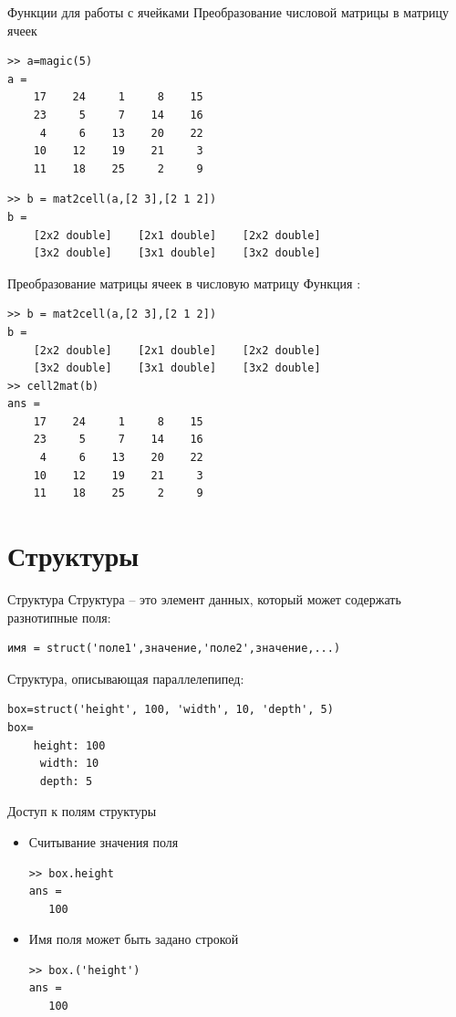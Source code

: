 \documentclass[11pt, compress]{beamer}
\begin{document}
\begin{frame}[fragile]{Функции для работы с ячейками}
Преобразование числовой матрицы в матрицу ячеек
\begin{lstlisting}
>> a=magic(5)
a =
    17    24     1     8    15
    23     5     7    14    16
     4     6    13    20    22
    10    12    19    21     3
    11    18    25     2     9
\end{lstlisting}
\pause
\begin{lstlisting}
>> b = mat2cell(a,[2 3],[2 1 2])
b = 
    [2x2 double]    [2x1 double]    [2x2 double]
    [3x2 double]    [3x1 double]    [3x2 double]
\end{lstlisting}
\end{frame}


\begin{frame}[fragile]{Преобразование матрицы ячеек в числовую матрицу}
Функция :
\begin{lstlisting}
>> b = mat2cell(a,[2 3],[2 1 2])
b = 
    [2x2 double]    [2x1 double]    [2x2 double]
    [3x2 double]    [3x1 double]    [3x2 double]
>> cell2mat(b)
ans =
    17    24     1     8    15
    23     5     7    14    16
     4     6    13    20    22
    10    12    19    21     3
    11    18    25     2     9
\end{lstlisting}
\end{frame}


\section{Структуры}

\begin{frame}[containsverbatim]{Структура}
Структура -- это элемент данных, который может содержать разнотипные \alert{поля}:
\begin{small}
\begin{Verbatim}[formatcom=\color{codecolor}]
  имя = struct('поле1',значение,'поле2',значение,...)
\end{Verbatim}   
\end{small}
Структура, описывающая параллелепипед:
\begin{lstlisting}[frame=single]
box=struct('height', 100, 'width', 10, 'depth', 5)
box= 
    height: 100
     width: 10
     depth: 5
\end{lstlisting}
\end{frame}

%
%
%

\begin{frame}[fragile]{Доступ к полям структуры}
\begin{itemize}
 \item Считывание значения поля
\begin{lstlisting} 
>> box.height
ans =
   100
\end{lstlisting}
  \item Имя поля может быть задано строкой
\begin{lstlisting}[frame=single]
>> box.('height')
ans =
   100
\end{lstlisting}
\end{itemize}
\end{frame}
\end{document}

